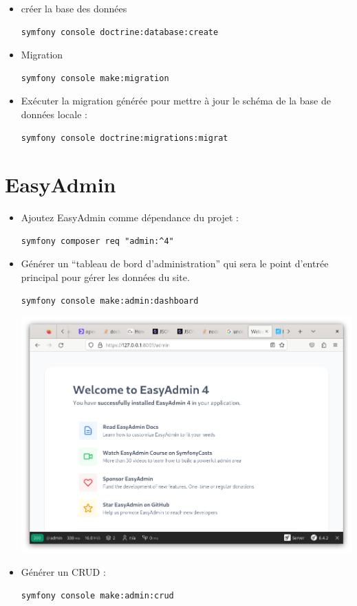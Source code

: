 \documentclass{article}
\begin{document}
\begin{itemize}
\item créer la base des données
\begin{verbatim}
symfony console doctrine:database:create
\end{verbatim}
\item  Migration
\begin{verbatim}
symfony console make:migration
\end{verbatim}
\item  Exécuter la migration générée pour mettre à jour
le schéma de la base de données locale :
\begin{verbatim}
symfony console doctrine:migrations:migrat
\end{verbatim}
\end{itemize}
\section{EasyAdmin}
\begin{itemize}
\item Ajoutez EasyAdmin comme dépendance du projet :
\begin{verbatim}
symfony composer req "admin:^4"
\end{verbatim}
\item Générer un “tableau de
bord d’administration” qui sera le point d’entrée principal pour gérer les données du site.
\begin{verbatim}
symfony console make:admin:dashboard
\end{verbatim}
\begin{center}
\includegraphics[width=15cm]{images/imageCommandes01.png}
\end{center}
\item Générer un CRUD  :
\begin{verbatim}
symfony console make:admin:crud
\end{verbatim}
\end{itemize}
\end{document}
